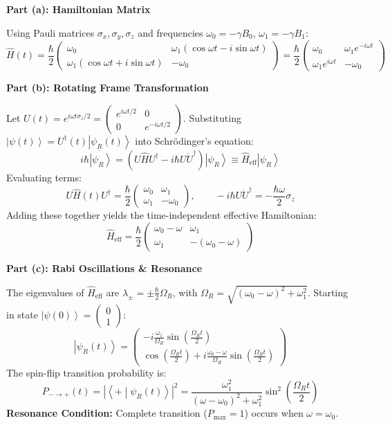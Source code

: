 \documentclass[11pt, a4paper, parskip=half]{scrartcl}
\newcommand{\ket}[1]{\left| #1 \right\rangle}
\newcommand{\braket}[2]{\left\langle #1 \middle| #2 \right\rangle}
\begin{document}
\begin{solutionbox}
\textbf{Part (a): Hamiltonian Matrix}

Using Pauli matrices $\sigma_x, \sigma_y, \sigma_z$ and frequencies $\omega_0 = -\gamma B_0$, $\omega_1 = -\gamma B_1$:
\[
\hat{H}(t) = \frac{\hbar}{2} \begin{pmatrix} \omega_0 & \omega_1 (\cos\omega t - i\sin\omega t) \\ \omega_1 (\cos\omega t + i\sin\omega t) & -\omega_0 \end{pmatrix} 
= \frac{\hbar}{2} \begin{pmatrix} \omega_0 & \omega_1 e^{-i\omega t} \\ \omega_1 e^{i\omega t} & -\omega_0 \end{pmatrix}
\]

\textbf{Part (b): Rotating Frame Transformation}

Let $U(t) = e^{i \omega t \sigma_z / 2} = \begin{pmatrix} e^{i\omega t/2} & 0 \\ 0 & e^{-i\omega t/2} \end{pmatrix}$. 
Substituting $\ket{\psi(t)} = U^\dagger(t)\ket{\psi_R(t)}$ into Schrödinger's equation:
\[
i\hbar \dot{\ket{\psi_R}} = \left( U \hat{H} U^\dagger - i\hbar U \dot{U}^\dagger \right) \ket{\psi_R} \equiv \hat{H}_{\text{eff}} \ket{\psi_R}
\]
Evaluating terms:
\[
U \hat{H}(t) U^\dagger = \frac{\hbar}{2} \begin{pmatrix} \omega_0 & \omega_1 \\ \omega_1 & -\omega_0 \end{pmatrix}, \qquad
-i\hbar U \dot{U}^\dagger = -\frac{\hbar\omega}{2}\sigma_z
\]
Adding these together yields the time-independent effective Hamiltonian:
\[
\hat{H}_{\text{eff}} = \frac{\hbar}{2} \begin{pmatrix} \omega_0 - \omega & \omega_1 \\ \omega_1 & -(\omega_0 - \omega) \end{pmatrix}
\]

\textbf{Part (c): Rabi Oscillations \& Resonance}

The eigenvalues of $\hat{H}_{\text{eff}}$ are $\lambda_\pm = \pm \frac{\hbar}{2} \Omega_R$, with $\Omega_R = \sqrt{(\omega_0 - \omega)^2 + \omega_1^2}$. 
Starting in state $\ket{\psi(0)} = \begin{pmatrix} 0 \\ 1 \end{pmatrix}$:
\[
\ket{\psi_R(t)} = \begin{pmatrix} -i \frac{\omega_1}{\Omega_R} \sin\left(\frac{\Omega_R t}{2}\right) \\[4pt] \cos\left(\frac{\Omega_R t}{2}\right) + i \frac{\omega_0 - \omega}{\Omega_R} \sin\left(\frac{\Omega_R t}{2}\right) \end{pmatrix}
\]
The spin-flip transition probability is:
\[
P_{-\to+}(t) = |\braket{+}{\psi_R(t)}|^2 = \frac{\omega_1^2}{(\omega - \omega_0)^2 + \omega_1^2} \sin^2\left( \frac{\Omega_R t}{2} \right)
\]
\textbf{Resonance Condition:} Complete transition ($P_{\max} = 1$) occurs when $\omega = \omega_0$.
\end{solutionbox}
\end{document}
